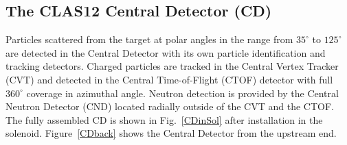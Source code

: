 \documentclass[final,3p]{elsarticle}
\begin{document}
\begin{twocolumn}
\section{The CLAS12 Central Detector (CD)}

Particles scattered from the target at polar angles in the range from $35^\circ$  to $125^\circ$ are detected in the
Central Detector with its own particle identification and tracking detectors. Charged particles are tracked in the
Central Vertex Tracker (CVT) and detected in the Central Time-of-Flight (CTOF) detector with full $360^\circ$
coverage in azimuthal angle. Neutron detection is provided by the Central Neutron Detector (CND) located radially
outside of the CVT and the CTOF.  The fully assembled CD is shown in Fig.~\ref{CDinSol} after installation in the
solenoid. Figure~\ref{CDback} shows the Central Detector from the upstream end.


\end{twocolumn}
\end{document}
